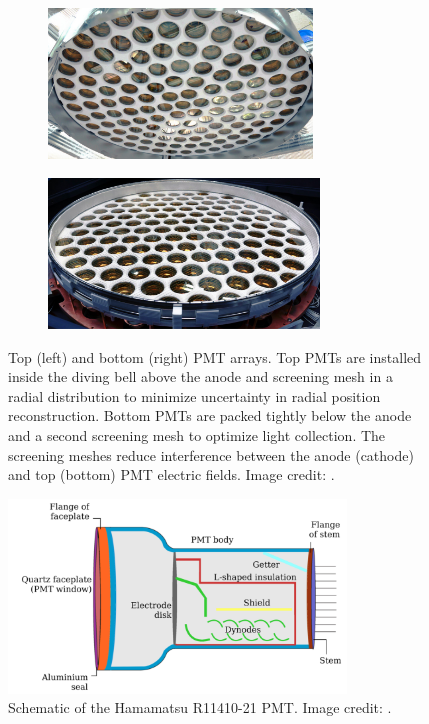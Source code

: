 \begin{figure}
    \centering
    \begin{subfigure}[t]{0.5\textwidth}
        \centering
        \includegraphics[height=4cm]{PMTTopArray}
    \end{subfigure}%
    \begin{subfigure}[t]{0.5\textwidth}
        \centering
        \includegraphics[height=4cm]{PMTBottomArray}
    \end{subfigure}
    \caption{Top (left) and bottom (right) PMT arrays.  Top PMTs are installed inside the diving bell above the anode and screening
    mesh in a radial distribution
    to minimize uncertainty in radial position reconstruction.  Bottom PMTs are packed tightly below the anode and a second screening mesh
    to optimize light collection.  The screening meshes reduce interference between the anode (cathode) and top (bottom) PMT electric
    fields.  Image credit: .}
	\label{fig:xenon1t_pmt_array}
\end{figure}

\begin{figure}
\centering
\includegraphics[width=0.8\textwidth]{PMTSchematic}
\caption{Schematic of the Hamamatsu R11410-21 PMT.  Image credit: .}
\label{fig:xenon1t_hamamatsu_pmt}
\end{figure}

